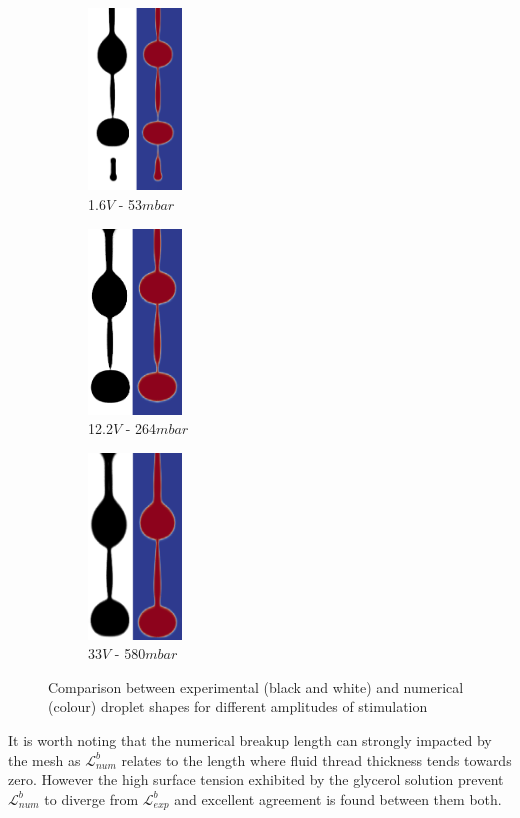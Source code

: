 \documentclass[twocolumn,10pt]{asme2ej}
\begin{document}
\begin{figure}[h]
    \centering
    \begin{subfigure}{2.7cm}
        \centering
        \includegraphics[width=2.5cm]{Glycerol/num_exp_053mbar_1.png}
        \caption{1.6$V$ - 53$mbar$}
    \end{subfigure}
    \hfill
    \begin{subfigure}{2.7cm}
        \centering
        \includegraphics[width=2.5cm]{Glycerol/num_exp_264mbar.png}
        \caption{12.2$V$ - 264$mbar$}
    \end{subfigure}
    \hfill
    \begin{subfigure}{2.7cm}
        \centering
        \includegraphics[width=2.5cm]{Glycerol/num_exp_580mbar_1.png}
        \caption{33$V$ - 580$mbar$}
    \end{subfigure}
       \caption{Comparison between experimental (black and white) and numerical (colour) droplet shapes for different amplitudes of stimulation}
       \label{fig:glycerolDrop}
\end{figure}
It is worth noting that the numerical breakup length can strongly impacted by the mesh as $\mathcal{L}_{num}^b$ relates to the length where fluid thread thickness tends towards zero. However the high surface tension exhibited by the glycerol solution prevent $\mathcal{L}_{num}^b$ to diverge from $\mathcal{L}_{exp}^b$ and excellent agreement is found between them both. 
\end{document}
